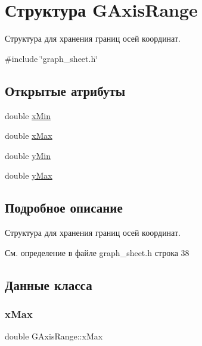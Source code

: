 \hypertarget{struct_g_axis_range}{}\section{Структура G\+Axis\+Range}
\label{struct_g_axis_range}


Структура для хранения границ осей координат.  




{\ttfamily \#include \char`\"{}graph\+\_\+sheet.\+h\char`\"{}}

\subsection*{Открытые атрибуты}
\begin{DoxyCompactItemize}
\item 
double \hyperlink{struct_g_axis_range_a01a9d0fa30092286df72949de7da0d1f}{x\+Min}
\item 
double \hyperlink{struct_g_axis_range_a9ba1a7215788c55bcab90ba3ba87f2de}{x\+Max}
\item 
double \hyperlink{struct_g_axis_range_abc64e1b37194dc086641670a92c62837}{y\+Min}
\item 
double \hyperlink{struct_g_axis_range_a4b2aad8d5fd79b13d555b278ca3b2fb2}{y\+Max}
\end{DoxyCompactItemize}


\subsection{Подробное описание}
Структура для хранения границ осей координат. 

См. определение в файле graph\+\_\+sheet.\+h строка 38



\subsection{Данные класса}
\hypertarget{struct_g_axis_range_a9ba1a7215788c55bcab90ba3ba87f2de}{}\label{struct_g_axis_range_a9ba1a7215788c55bcab90ba3ba87f2de} 
\subsubsection{\texorpdfstring{x\+Max}{xMax}}
{\footnotesize\ttfamily double G\+Axis\+Range\+::x\+Max}

